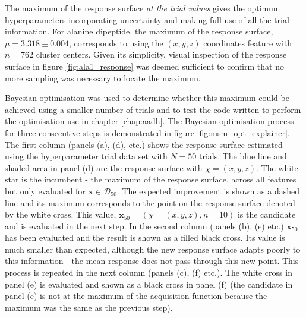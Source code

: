The maximum of the response surface \emph{at the trial values} gives the optimum hyperparameters incorporating uncertainty and making full use of all the trial information. For alanine dipeptide, the maximum of the response surface, $\mu=\num{3.318}\pm\num{0.004}$, corresponds to using the $(x, y, z)$ coordinates feature with $n=762$ cluster centers. Given its simplicity, visual inspection of the response surface in figure \ref{fig:ala1_response} was deemed sufficient to confirm that no more sampling was necessary to locate the maximum. 

Bayesian optimisation was used to determine whether this maximum could be achieved using a smaller number of trials and to test the code written to perform the optimisation use in chapter \ref{chap:aadh}. The Bayesian optimisation process for three consecutive steps is demonstrated in figure \ref{fig:msm_opt_explainer}. The first column (panels (a), (d), etc.) shows the response surface estimated using the hyperparameter trial data set with $N=50$ trials. The blue line and shaded area in panel (d) are the response surface with $\chi=(x, y, z)$. The white star is the incumbent - the maximum of the response surface, across all features but only evaluated for $\mathbf{x}\in \mathcal{D}_{50}$. The expected improvement is shown as a dashed line and its maximum corresponds to the point on the response surface denoted by the white cross. This value,  $\mathbf{x}_{50} = \left(\chi=(x, y, z), n=10\right)$ is the candidate and is evaluated in the  next step. In the second column (panels (b), (e) etc.) $\mathbf{x}_{50}$ has been evaluated and the result is shown as a filled black cross. Its value is much smaller than expected, although the new response surface adapts poorly to this information - the mean response does not pass through this new point. This process is repeated in the next column (panels (c), (f) etc.). The white cross in panel (e) is evaluated and shown as a black cross in panel (f) (the candidate in panel (e) is not at the maximum of the acquisition function because the maximum  was the same as the previous step).

